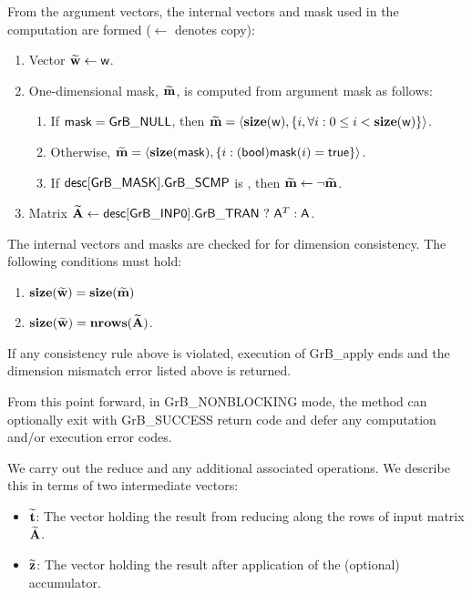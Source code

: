 From the argument vectors, the internal vectors and mask used in 
the computation are formed ($\leftarrow$ denotes copy):
\begin{enumerate}
	\item Vector ${\bf \widetilde{w}} \leftarrow {\sf w}$.

	\item One-dimensional mask, ${\bf \widetilde{m}}$, is computed from 
    argument {\sf mask} as follows:
	\begin{enumerate}
		\item	If ${\sf mask} = {\sf GrB\_NULL}$, then ${\bf \widetilde{m}} = 
        \langle \bold{size}({\sf w}), \{i, \forall i : 0 \leq i < 
        \bold{size}({\sf w}) \} \rangle$.

		\item	Otherwise, ${\bf \widetilde{m}} = 
        \langle \bold{size}({\sf mask}), \{i : ({\sf bool}){\sf mask}(i) = 
        {\sf true}\} \rangle$.

		\item	If ${\sf desc[GrB\_MASK].GrB\_SCMP}$ is \true, then 
        ${\bf \widetilde{m}} \leftarrow \neg {\bf \widetilde{m}}$.
	\end{enumerate}

	\item Matrix ${\bf \widetilde{A}} \leftarrow 
    {\sf desc[GrB\_INP0].GrB\_TRAN} \ ? \ {\sf A}^T : {\sf A}$.
    
\end{enumerate}

The internal vectors and masks are checked for for dimension consistency. 
The following conditions must hold:
\begin{enumerate}
	\item $\bold{size}({\bf \widetilde{w}}) = \bold{size}({\bf \widetilde{m}})$
	\item $\bold{size}({\bf \widetilde{w}}) = \bold{nrows}({\bf \widetilde{A}})$.
\end{enumerate}
If any consistency rule above is violated, execution of {\sf GrB\_apply} ends and 
the dimension mismatch error listed above is returned.

From this point forward, in {\sf GrB\_NONBLOCKING} mode, the method can optionally exit
with {\sf GrB\_SUCCESS} return code and defer any computation and/or execution error codes.

We carry out the reduce and any additional 
associated operations.  We describe this in terms of two intermediate vectors:
\begin{itemize}
	\item ${\bf \widetilde{t}}$: The vector holding the result from reducing along the rows of input matrix
    ${\bf \widetilde{A}}$.
	\item ${\bf \widetilde{z}}$: The vector holding the result after 
    application of the (optional) accumulator.
\end{itemize}

